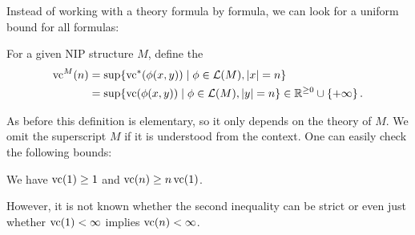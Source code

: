 Instead of working with a theory formula by formula, we can look for a uniform bound for all formulas:
\begin{Definition} \label{vc_fn_def}
  For a given NIP structure $M$, define the 
  \begin{align*}
    \operatorname{vc}^M(n) &= \sup \{\operatorname{vc}^*(\phi(x, y)) \mid \phi \in \mathcal L(M), |x| = n\} \\
             &= \sup \{\operatorname{vc}(\phi(x, y)) \mid \phi \in \mathcal L(M), |y| = n\} \in \mathbb{R}^{\geq 0} \cup \left\{+\infty\right\}.
  \end{align*}
\end{Definition}

As before this definition is elementary, so it only depends on the theory of $M$.
We omit the superscript $M$ if it is understood from the context.
One can easily check the following bounds:
\begin{Lemma}  We have $\operatorname{vc}(1) \geq 1$ and $\operatorname{vc}(n) \geq n\operatorname{vc}(1)$.
  
\end{Lemma}

However, it is not known whether the second inequality can be strict or even just whether $\operatorname{vc}(1) < \infty$ implies $\operatorname{vc}(n) < \infty$.
